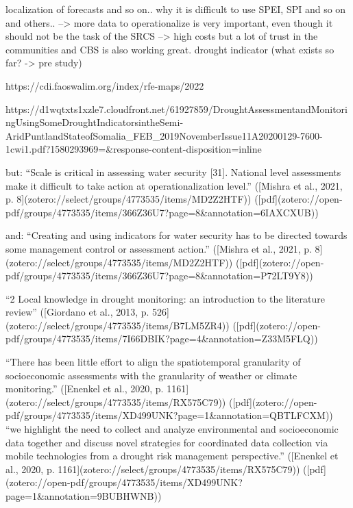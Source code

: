 localization of forecasts and so on.. why it is difficult to use SPEI, SPI and so on and others.. --> more data to operationalize is very important, even though it should not be the task of the SRCS --> high costs but a lot of trust in the communities and CBS is also working great.
drought indicator (what exists so far? -> pre study)

https://cdi.faoswalim.org/index/rfe-maps/2022

https://d1wqtxts1xzle7.cloudfront.net/61927859/DroughtAssessmentandMonitoringUsingSomeDroughtIndicatorsintheSemi-AridPuntlandStateofSomalia_FEB_2019NovemberIssue11A20200129-7600-1cwi1.pdf?1580293969=&response-content-disposition=inline%

but: 
“Scale is critical in assessing water security [31]. National level assessments make it difficult to take action at operationalization level.” ([Mishra et al., 2021, p. 8](zotero://select/groups/4773535/items/MD2Z2HTF)) ([pdf](zotero://open-pdf/groups/4773535/items/366Z36U7?page=8&annotation=6IAXCXUB))

and: “Creating and using indicators for water security has to be directed towards some management control or assessment action.” ([Mishra et al., 2021, p. 8](zotero://select/groups/4773535/items/MD2Z2HTF)) ([pdf](zotero://open-pdf/groups/4773535/items/366Z36U7?page=8&annotation=P72LT9Y8))


“2 Local knowledge in drought monitoring: an introduction to the literature review” ([Giordano et al., 2013, p. 526](zotero://select/groups/4773535/items/B7LM5ZR4)) ([pdf](zotero://open-pdf/groups/4773535/items/7I66DBIK?page=4&annotation=Z33M5FLQ))

“There has been little effort to align the spatiotemporal granularity of socioeconomic assessments with the granularity of weather or climate monitoring.” ([Enenkel et al., 2020, p. 1161](zotero://select/groups/4773535/items/RX575C79)) ([pdf](zotero://open-pdf/groups/4773535/items/XD499UNK?page=1&annotation=QBTLFCXM))
“we highlight the need to collect and analyze environmental and socioeconomic data together and discuss novel strategies for coordinated data collection via mobile technologies from a drought risk management perspective.” ([Enenkel et al., 2020, p. 1161](zotero://select/groups/4773535/items/RX575C79)) ([pdf](zotero://open-pdf/groups/4773535/items/XD499UNK?page=1&annotation=9BUBHWNB))

